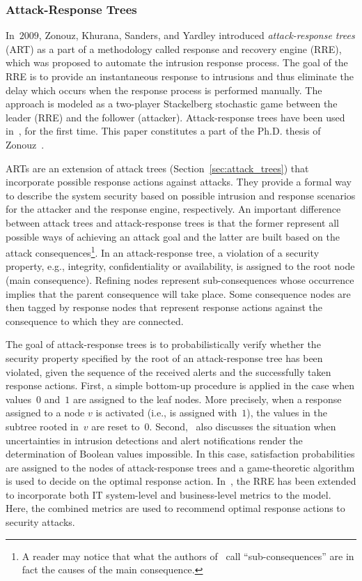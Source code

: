 \documentclass[a4paper]{article}
\begin{document}
\subsubsection{Attack-Response Trees} 
\label{sec:attack_response_trees}

In~$2009$, Zonouz, Khurana, Sanders, and Yardley introduced
\emph{attack-response trees} (ART) as a part of a methodology called response
and recovery engine (RRE), which was proposed to automate the intrusion response
process. The goal of the RRE is to provide an instantaneous response to
intrusions and thus eliminate the delay which occurs when the response process
is performed manually. The approach is modeled as a two-player Stackelberg
stochastic game between the leader (RRE) and the follower (attacker).
Attack-response trees have been used in~\cite{ZoKhSaYa}, for the first time.
This paper constitutes a part of the Ph.D. thesis of Zonouz~\cite{Zonouz}.

ARTs are an extension of attack trees (Section~\ref{sec:attack_trees}) that
incorporate possible response actions against attacks. They provide a formal way
to describe the system security based on possible intrusion and response
scenarios for the attacker and the response engine, respectively. An important
difference between attack trees and attack-response trees is that the former
represent all possible ways of achieving an attack goal and the latter are built
based on the attack consequences\footnote{A reader may notice that  what the
authors of~\cite{ZoKhSaYa} call ``sub-consequences'' are in fact the  causes of
the main consequence.}. In an attack-response tree, a violation of a security
property, e.g., integrity, confidentiality or availability, is assigned to the
root node (main consequence). Refining nodes represent sub-consequences whose
occurrence implies that the parent consequence will take place. Some consequence
nodes are then tagged by response nodes that represent response actions against
the consequence to which they are connected.

The goal of attack-response trees is to probabilistically verify whether the
security property specified by the root of an attack-response tree has been
violated, given the sequence of the received alerts and the successfully taken
response actions. First, a simple bottom-up procedure is applied in the case
when values~$0$ and~$1$ are assigned to the leaf nodes. More precisely, when a
response assigned to a node $v$ is activated (i.e., is assigned with~$1$), the
values in the subtree rooted in~$v$ are reset to~$0$. Second,~\cite{ZoKhSaYa}
also discusses the situation when uncertainties in intrusion detections and
alert notifications render the determination of Boolean values impossible. In
this case, satisfaction probabilities are assigned to the nodes of
attack-response trees and a game-theoretic algorithm is used to decide on the
optimal response action. In~\cite{ZoShRaKaPfAuIySaCo}, the RRE has been extended
to incorporate both IT system-level and business-level metrics to the model.
Here, the combined metrics are used to recommend optimal response actions to
security attacks.
\end{document}
